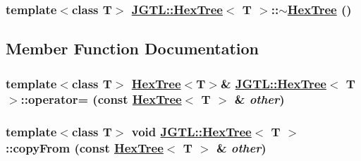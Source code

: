 \hypertarget{class_j_g_t_l_1_1_hex_tree_d378b61bdb0638b99d2afd06cf90a62e}{
\subsubsection[$\sim$HexTree]{\setlength{\rightskip}{0pt plus 5cm}template$<$class T$>$ \hyperlink{class_j_g_t_l_1_1_hex_tree}{JGTL::Hex\-Tree}$<$ T $>$::$\sim$\hyperlink{class_j_g_t_l_1_1_hex_tree}{Hex\-Tree} ()}}
\label{class_j_g_t_l_1_1_hex_tree_d378b61bdb0638b99d2afd06cf90a62e}




\subsection{Member Function Documentation}
\hypertarget{class_j_g_t_l_1_1_hex_tree_511cd2289f7aced36c88122de0b41dbc}{
\subsubsection[operator=]{\setlength{\rightskip}{0pt plus 5cm}template$<$class T$>$ \hyperlink{class_j_g_t_l_1_1_hex_tree}{Hex\-Tree}$<$T$>$\& \hyperlink{class_j_g_t_l_1_1_hex_tree}{JGTL::Hex\-Tree}$<$ T $>$::operator= (const \hyperlink{class_j_g_t_l_1_1_hex_tree}{Hex\-Tree}$<$ T $>$ \& {\em other})}}
\label{class_j_g_t_l_1_1_hex_tree_511cd2289f7aced36c88122de0b41dbc}


\hypertarget{class_j_g_t_l_1_1_hex_tree_6d8486ed19b1f07ae74b85fcb6bc6969}{
\subsubsection[copyFrom]{\setlength{\rightskip}{0pt plus 5cm}template$<$class T$>$ void \hyperlink{class_j_g_t_l_1_1_hex_tree}{JGTL::Hex\-Tree}$<$ T $>$::copy\-From (const \hyperlink{class_j_g_t_l_1_1_hex_tree}{Hex\-Tree}$<$ T $>$ \& {\em other})}}
\label{class_j_g_t_l_1_1_hex_tree_6d8486ed19b1f07ae74b85fcb6bc6969}


